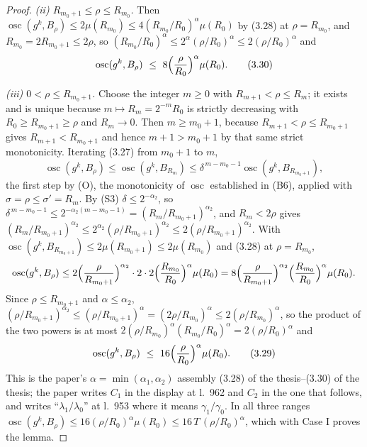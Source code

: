 \begin{proof}
\emph{(ii) $R_{m_0+1}\le\rho\le R_{m_0}$.}  Then
$\operatorname*{osc}(g^k,B_\rho)\le2\mu(R_{m_0})\le4(R_{m_0}/R_0)^{\alpha}\mu(R_0)$
by (3.28) at $\rho=R_{m_0}$, and $R_{m_0}=2R_{m_0+1}\le2\rho$, so
$(R_{m_0}/R_0)^{\alpha}\le2^{\alpha}(\rho/R_0)^{\alpha}\le2(\rho/R_0)^{\alpha}$
and
\[
\operatorname*{osc}(g^k,B_\rho)\ \le\ 8\Bigl(\frac\rho{R_0}\Bigr)^{\alpha}\mu(R_0).
\tag{3.30}
\]

\emph{(iii) $0<\rho\le R_{m_0+1}$.}  Choose the integer $m\ge0$ with
$R_{m+1}<\rho\le R_m$; it exists and is unique because $m\mapsto R_m=2^{-m}R_0$
is strictly decreasing with $R_0\ge R_{m_0+1}\ge\rho$ and $R_m\to0$.  Then
$m\ge m_0+1$, because $R_{m+1}<\rho\le R_{m_0+1}$ gives $R_{m+1}<R_{m_0+1}$ and
hence $m+1>m_0+1$ by that same strict monotonicity.  Iterating (3.27) from
$m_0+1$ to $m$,
\[
\operatorname*{osc}(g^k,B_\rho)\le\operatorname*{osc}(g^k,B_{R_m})
\le\delta^{\,m-m_0-1}\operatorname*{osc}(g^k,B_{R_{m_0+1}}),
\]
the first step by (O), the monotonicity of $\operatorname*{osc}$ established in
(B6), applied with $\sigma=\rho\le\sigma'=R_m$.  By
(S3) $\delta\le2^{-\alpha_2}$, so
$\delta^{\,m-m_0-1}\le2^{-\alpha_2(m-m_0-1)}=(R_m/R_{m_0+1})^{\alpha_2}$, and
$R_m<2\rho$ gives $(R_m/R_{m_0+1})^{\alpha_2}\le
2^{\alpha_2}(\rho/R_{m_0+1})^{\alpha_2}\le2(\rho/R_{m_0+1})^{\alpha_2}$.  With
$\operatorname*{osc}(g^k,B_{R_{m_0+1}})\le2\mu(R_{m_0+1})\le2\mu(R_{m_0})$ and
(3.28) at $\rho=R_{m_0}$,
\[
\operatorname*{osc}(g^k,B_\rho)
\le2\Bigl(\frac\rho{R_{m_0+1}}\Bigr)^{\alpha_2}\cdot2\cdot
2\Bigl(\frac{R_{m_0}}{R_0}\Bigr)^{\alpha}\mu(R_0)
=8\Bigl(\frac\rho{R_{m_0+1}}\Bigr)^{\alpha_2}
\Bigl(\frac{R_{m_0}}{R_0}\Bigr)^{\alpha}\mu(R_0).
\]
Since $\rho\le R_{m_0+1}$ and $\alpha\le\alpha_2$,
$(\rho/R_{m_0+1})^{\alpha_2}\le(\rho/R_{m_0+1})^{\alpha}
=(2\rho/R_{m_0})^{\alpha}\le2(\rho/R_{m_0})^{\alpha}$, so the product of the two
powers is at most $2(\rho/R_{m_0})^{\alpha}(R_{m_0}/R_0)^{\alpha}
=2(\rho/R_0)^{\alpha}$ and
\[
\operatorname*{osc}(g^k,B_\rho)\ \le\ 16\Bigl(\frac\rho{R_0}\Bigr)^{\alpha}\mu(R_0).
\tag{3.29}
\]
This is the paper's $\alpha=\min(\alpha_1,\alpha_2)$ assembly
(3.28) of the thesis--(3.30) of the thesis; the paper writes $C_1$ in the display at
l.~962 and $C_2$ in the one that follows, and writes
``$\lambda_1/\lambda_0$'' at l.~953 where it means $\gamma_1/\gamma_0$.  In all
three ranges $\operatorname*{osc}(g^k,B_\rho)\le16(\rho/R_0)^{\alpha}\mu(R_0)
\le16\,T\,(\rho/R_0)^{\alpha}$, which with Case I proves
the lemma.

\end{proof}
